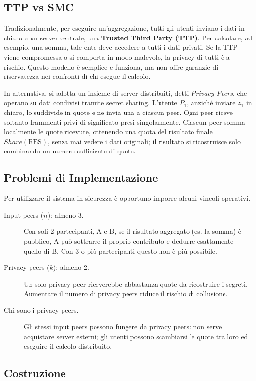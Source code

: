 \documentclass[a4paper, 11pt]{article}
\begin{document}
\subsection{TTP vs SMC}

Tradizionalmente, per eseguire un'aggregazione, tutti gli utenti inviano i dati in chiaro a un server centrale, una \textbf{Trusted Third Party (TTP)}. Per calcolare, ad esempio, una somma, tale ente deve accedere a tutti i dati privati. Se la TTP viene compromessa o si comporta in modo malevolo, la privacy di tutti è a rischio. Questo modello è semplice e funziona, ma non offre garanzie di riservatezza nei confronti di chi esegue il calcolo.

In alternativa, si adotta un insieme di server distribuiti, detti \textit{Privacy Peers}, che operano su dati condivisi tramite secret sharing. L'utente $P_1$, anziché inviare $z_1$ in chiaro, lo suddivide in quote e ne invia una a ciascun peer. Ogni peer riceve soltanto frammenti privi di significato presi singolarmente. Ciascun peer somma localmente le quote ricevute, ottenendo una quota del risultato finale $Share(\mathrm{RES})$, senza mai vedere i dati originali; il risultato si ricostruisce solo combinando un numero sufficiente di quote.

\subsection{Problemi di Implementazione}
Per utilizzare il sistema in sicurezza è opportuno imporre alcuni vincoli operativi.
\begin{description}
    \item[Input peers ($n$): almeno 3.] Con soli 2 partecipanti, A e B, se il risultato aggregato (es. la somma) è pubblico, A può sottrarre il proprio contributo e dedurre esattamente quello di B. Con 3 o più partecipanti questo non è più possibile.
    \item[Privacy peers ($k$): almeno 2.] Un solo privacy peer riceverebbe abbastanza quote da ricostruire i segreti. Aumentare il numero di privacy peers riduce il rischio di collusione.
    \item[Chi sono i privacy peers.] Gli stessi input peers possono fungere da privacy peers: non serve acquistare server esterni; gli utenti possono scambiarsi le quote tra loro ed eseguire il calcolo distribuito.
\end{description}

\subsection{Costruzione}
\end{document}
